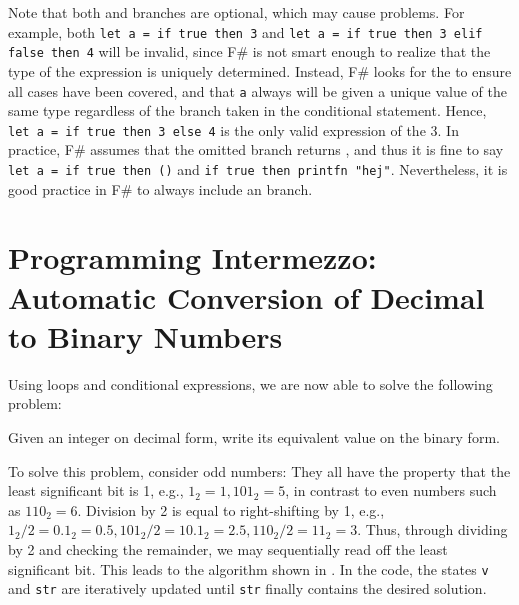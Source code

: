Note that both  and  branches are optional, which may cause problems. For example, both \mbox{\lstinline!let a = if true then 3!} and \mbox{\lstinline!let a = if true then 3 elif false then 4!}  will be invalid, since F\# is not smart enough to realize that the type of the expression is uniquely determined. Instead, F\# looks for the  to ensure all cases have been covered, and that \lstinline!a! always will be given a unique value of the same type regardless of the branch taken in the conditional statement. Hence, \mbox{\lstinline!let a = if true then 3 else 4!}  is the only valid expression of the 3. In practice, F\# assumes that the omitted branch returns \lexeme{()}, and thus it is fine to say \mbox{\lstinline!let a = if true then ()!} and \mbox{\lstinline!if true then printfn "hej"!}. Nevertheless, it is good practice in F\# to always include an  branch.

\section{Programming Intermezzo: Automatic Conversion of Decimal to Binary Numbers}
Using loops and conditional expressions, we are now able to solve the following problem:
\begin{problem}
  Given an integer on decimal form, write its equivalent value on the binary form.
\end{problem}
To solve this problem, consider odd numbers: They all have the property that the least significant bit is 1, e.g., $1_2 = 1, 101_2 = 5$, in contrast to even numbers such as $110_2 = 6$. Division by 2 is equal to right-shifting by 1, e.g., $1_2/2 = 0.1_2 = 0.5, 101_2/2 = 10.1_2 = 2.5, 110_2/2 = 11_2 = 3$. Thus, through dividing by 2 and checking the remainder, we may sequentially read off the least significant bit. This leads to the algorithm shown in .
%
%
In the code, the states \lstinline!v! and \lstinline!str! are iteratively updated until \lstinline!str! finally contains the desired solution.

